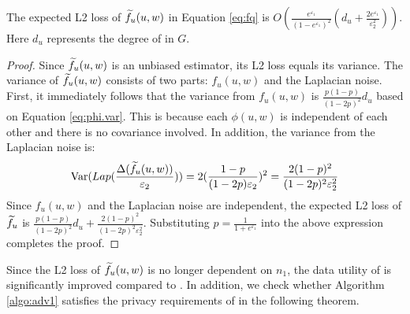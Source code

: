 \begin{theorem}
\label{thm:fq}
The expected L2 loss of $\widetilde{f}_u(u,w)$ in Equation \ref{eq:fq} is 
$  O(\frac{ e^{\varepsilon_1}}{(1 - e^{\varepsilon_1})^2} (d_u + \frac{ 2 e^{\varepsilon_1}}{\varepsilon_2^2} ) )$. Here $d_u$ represents the degree of \vq in $G$. 
\end{theorem}
\begin{proof}
Since $\widetilde{f}_u(u,w)$ is an unbiased estimator, its L2 loss equals its variance. 
The variance of $\widetilde{f}_u(u,w)$ consists of two parts: $f_u(u,w)$ and the Laplacian noise. 
First, it immediately follows that the variance from $f_u(u,w)$ is $\frac{p(1-p)}{(1-2p)^2} d_u $ based on Equation \ref{eq:phi.var}. This is because each $\phi(u, w)$ is independent of each other and there is no covariance involved. 
In addition, the variance from the Laplacian noise is: 
$$
\mathrm{Var}(Lap(\frac{\Delta(\widetilde{f}_u(u, w))}{\varepsilon_2})) = 2 (\frac{1-p}{(1-2p)\varepsilon_2})^2
 = \frac{2(1-p)^2}{(1-2p)^2\varepsilon_2^2}
$$
Since $f_u(u,w)$ and the Laplacian noise are independent, the expected L2 loss of $\widetilde{f}_u$ is
$\frac{p(1-p)}{(1-2p)^2} d_u  + \frac{2(1-p)^2}{(1-2p)^2\varepsilon_2^2}$. 
Substituting $p = \frac{1}{1+ e^{\varepsilon_1}}$ into the above expression completes the proof. 
\end{proof}
{Since the L2 loss of $\widetilde{f}_u(u,w)$ is no longer dependent on $n_1$, the data utility of \advss is significantly improved compared to \bs.} 
In addition, we check whether Algorithm \ref{algo:adv1} satisfies the privacy requirements of \epldp in the following theorem. 
